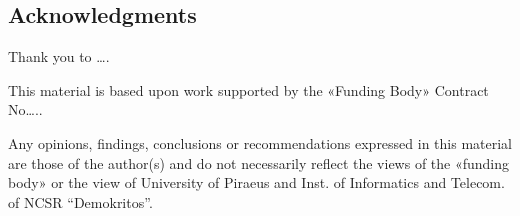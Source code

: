 \subsection*{Acknowledgments}

\begin{flushleft}
    Thank you to ….
    
    This material is based upon work supported by the «Funding Body» Contract No…..
    
    Any opinions, findings, conclusions or recommendations expressed in this material are those of the author(s) and do not necessarily reflect the views of the «funding body» or the view of University of Piraeus and Inst. of Informatics and Telecom. of NCSR “Demokritos”. 
\end{flushleft}